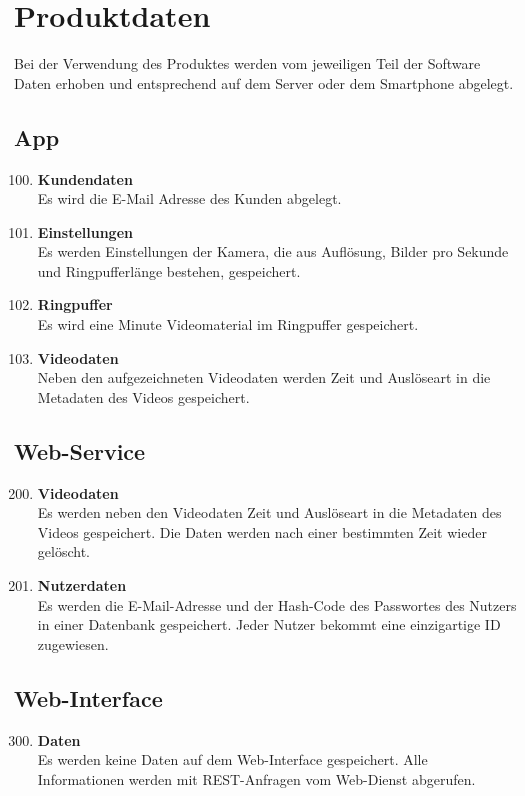 \chapter{Produktdaten}
Bei der Verwendung des Produktes werden vom jeweiligen Teil der Software Daten erhoben und entsprechend auf dem Server oder dem \gls{Smartphone} abgelegt.
\section{\gls{App}}
\begin{enumerate}[\bfseries{PD}10]
	\setcounter{enumi}{99}
\item \textbf{Kundendaten} \hfill \\
Es wird die E-Mail Adresse des Kunden abgelegt.
\item \textbf{Einstellungen} \hfill \\
Es werden Einstellungen der Kamera, die aus Auflösung, Bilder pro Sekunde und \gls{Ringpuffer}länge bestehen, gespeichert.
\item \textbf{\gls{Ringpuffer}} \hfill \\
Es wird eine Minute Videomaterial im \gls{Ringpuffer} gespeichert.
\item \textbf{Videodaten} \hfill \\
Neben den aufgezeichneten Videodaten werden Zeit und Auslöseart in die \gls{Metadaten} des Videos gespeichert.
\end{enumerate}

\section{Web-Service}
\begin{enumerate}[\bfseries{PK}10]
	\setcounter{enumi}{199}
\item \textbf{Videodaten} \hfill \\
Es werden neben den Videodaten Zeit und Auslöseart in die \gls{Metadaten} des Videos gespeichert. Die Daten werden nach einer bestimmten Zeit wieder gelöscht.
\item \textbf{Nutzerdaten} \hfill \\
Es werden die \gls{E-Mail}-Adresse und der \gls{Hash-Code} des Passwortes des Nutzers in einer Datenbank gespeichert. Jeder Nutzer bekommt eine einzigartige ID zugewiesen. 
\end{enumerate}

\section{\gls{Web-Interface}}
\begin{enumerate}[\bfseries{PK}10]
	\setcounter{enumi}{299}
\item \textbf{Daten} \hfill \\
Es werden keine Daten auf dem \gls{Web-Interface} gespeichert. Alle Informationen werden mit REST-Anfragen vom \gls{Web-Dienst} abgerufen.
\end{enumerate}


